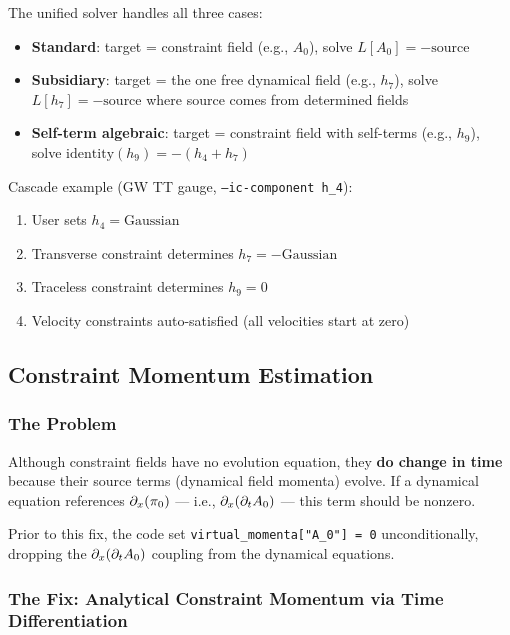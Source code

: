The unified solver handles all three cases:

\begin{itemize}
  \item \textbf{Standard}: target = constraint field (e.g., $A_0$), solve $L[A_0] = -\text{source}$
  \item \textbf{Subsidiary}: target = the one free dynamical field (e.g., $h_7$),
    solve $L[h_7] = -\text{source}$ where source comes from determined fields
  \item \textbf{Self-term algebraic}: target = constraint field with self-terms (e.g., $h_9$),
    solve $\mathrm{identity}(h_9) = -(h_4 + h_7)$
\end{itemize}

Cascade example (GW TT gauge, \texttt{--ic-component h\_4}):

\begin{enumerate}
  \item User sets $h_4 = \text{Gaussian}$
  \item Transverse constraint determines $h_7 = -\text{Gaussian}$
  \item Traceless constraint determines $h_9 = 0$
  \item Velocity constraints auto-satisfied (all velocities start at zero)
\end{enumerate}

\subsection{Constraint Momentum Estimation}
\label{sec:cf-momentum}

\subsubsection{The Problem}
\label{sec:cf-momentum-problem}

Although constraint fields have no evolution equation, they \textbf{do change in
time} because their source terms (dynamical field momenta) evolve. If a
dynamical equation references $\partial_x(\pi_0)$ --- i.e., $\partial_x(\partial_t A_0)$ ---
this term should be nonzero.

Prior to this fix, the code set \texttt{virtual\_momenta["A\_0"] = 0} unconditionally,
dropping the $\partial_x(\partial_t A_0)$ coupling from the dynamical equations.

\subsubsection{The Fix: Analytical Constraint Momentum via Time Differentiation}
\label{sec:cf-momentum-fix}


